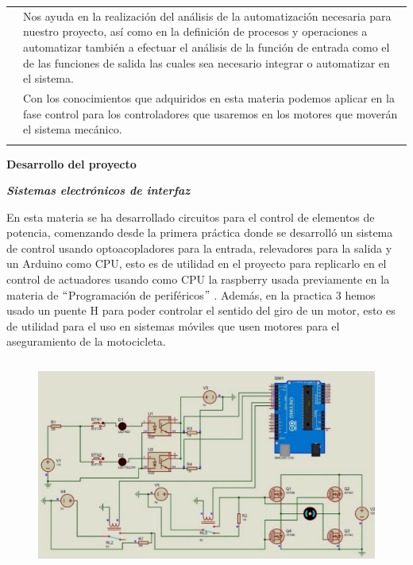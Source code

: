 \documentclass[12pt]{article}
\begin{document}
\begin{table}[H]
\begin{tabular}{p{1.26in}p{4.83in}}
\hhline{--}
\multicolumn{1}{|p{1.26in}}{\Centering {\fontsize{10pt}{12.0pt}\selectfont SISTEMAS ELECTRÓNICOS DE INTERFAZ}} & 
\multicolumn{1}{|p{4.83in}|}{Nos ayuda en la realización del análisis de la automatización necesaria para nuestro proyecto, así como en la definición de procesos y operaciones a automatizar también a efectuar el análisis de la función de entrada como el de las funciones de salida las cuales sea necesario integrar o automatizar en el sistema.} \\
\hhline{--}
\multicolumn{1}{|p{1.26in}}{\Centering {\fontsize{10pt}{12.0pt}\selectfont CONTROLADORES LÓGICOS PROGRAMABLES}} & 
\multicolumn{1}{|p{4.83in}|}{{\fontsize{10pt}{12.0pt}\selectfont  }Con los conocimientos que adquiridos en esta materia podemos aplicar en la fase control para los controladores que usaremos en los motores que moverán el sistema mecánico.} \\
\hhline{--}

\end{tabular}
 \end{table}


\newpage


\vspace{\baselineskip}
\textbf{Desarrollo del proyecto }\par

\textbf{\textit{Sistemas electrónicos de interfaz }}\par

En esta materia se ha desarrollado circuitos para el control de elementos de potencia, comenzando desde la primera práctica donde se desarrolló un sistema de control usando optoacopladores para la entrada, relevadores para la salida y un Arduino como CPU, esto es de utilidad en el proyecto para replicarlo en el control de actuadores usando como CPU la raspberry usada previamente en la materia de $``$Programación de periféricos$"$ . Además, en la practica 3 hemos usado un puente H para poder controlar el sentido del giro de un motor, esto es de utilidad para el uso en sistemas móviles que usen motores para el aseguramiento de la motocicleta.\par





\begin{figure}[H]
\advance\leftskip 1.15in		\includegraphics[width=4.91in,height=2.73in]{./media/image4.jpeg}
\end{figure}
\end{document}
